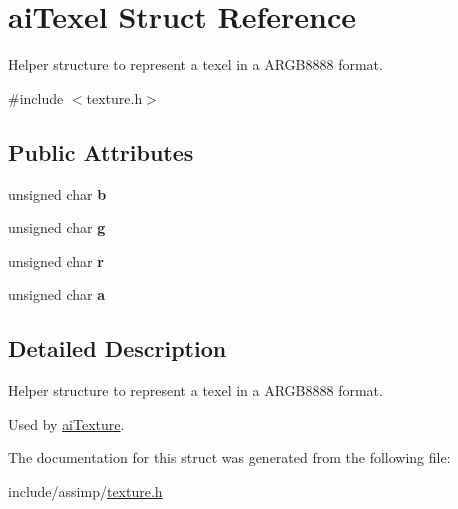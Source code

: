\hypertarget{structaiTexel}{\section{ai\-Texel \-Struct \-Reference}
\label{structaiTexel}
}


\-Helper structure to represent a texel in a \-A\-R\-G\-B8888 format.  




{\ttfamily \#include $<$texture.\-h$>$}

\subsection*{\-Public \-Attributes}
\begin{DoxyCompactItemize}
\item 
\hypertarget{structaiTexel_a5b4f97f69cf59cb9065af67389599ba6}{unsigned char {\bfseries b}}\label{structaiTexel_a5b4f97f69cf59cb9065af67389599ba6}

\item 
\hypertarget{structaiTexel_a41da3516b8241165e4ca58ea8ed68fe6}{unsigned char {\bfseries g}}\label{structaiTexel_a41da3516b8241165e4ca58ea8ed68fe6}

\item 
\hypertarget{structaiTexel_ae9408c0d18f6ff597715cc626398a0ff}{unsigned char {\bfseries r}}\label{structaiTexel_ae9408c0d18f6ff597715cc626398a0ff}

\item 
\hypertarget{structaiTexel_a6d4450e83b02b29d24f7aab27958034e}{unsigned char {\bfseries a}}\label{structaiTexel_a6d4450e83b02b29d24f7aab27958034e}

\end{DoxyCompactItemize}


\subsection{\-Detailed \-Description}
\-Helper structure to represent a texel in a \-A\-R\-G\-B8888 format. 

\-Used by \hyperlink{structaiTexture}{ai\-Texture}. 

\-The documentation for this struct was generated from the following file\-:\begin{DoxyCompactItemize}
\item 
include/assimp/\hyperlink{texture_8h}{texture.\-h}\end{DoxyCompactItemize}
